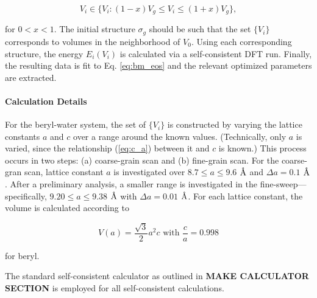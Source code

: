         \begin{equation}
        \label{eq:ensem_eos}
            V_i \in \{ V_i : (1-x)V_g \le V_i \le (1+x) V_g \},
        \end{equation}
        
        \noindet for $0<x<1$. The initial structure $\sigma_g$ should be such that the set $\{V_i\}$ corresponds to volumes in the neighborhood of $V_0$. Using each corresponding structure, the energy $E_i(V_i)$ is calculated via a self-consistent DFT run. Finally, the resulting data is fit to Eq. \ref{eq:bm_eos} and the relevant optimized parameters are extracted.
        
        \paragraph{Calculation Details} For the beryl-water system, the set of $\{ V_i\}$  is constructed by varying the lattice constants $a$ and $c$ over a range around the known values. (Technically, only $a$ is varied, since the relationship (\ref{eq:c_a}) between it and $c$ is known.) This process occurs in two steps: (a) coarse-grain scan and (b) fine-grain scan. For the coarse-gran scan, lattice constant $a$ is investigated over $8.7 \le a \le 9.6$ $\text{\normalfont\AA}$ and $\Delta a = 0.1$ $\text{\normalfont\AA}$. After a preliminary analysis, a smaller range is investigated in the fine-sweep---specifically, $9.20 \le a \le 9.38$ $\text{\normalfont\AA}$ with $\Delta a=0.01$ $\text{\normalfont\AA}$. For each lattice constant, the volume is calculated according to 
            
            \begin{equation}
            \label{eq:c_a}
                V(a) = \frac{\sqrt{3}}{2} a^2 c \text{ with } \frac{c}{a} = 0.998
            \end{equation}
            
            \noindent for beryl.
            
        The standard self-consistent calculator as outlined in \textbf{MAKE CALCULATOR SECTION} is employed for all self-consistent calculations. 
            
        
        
